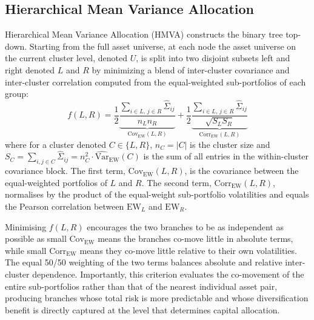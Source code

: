 \documentclass[12pt]{article}
\begin{document}
\subsection{Hierarchical Mean Variance Allocation}
Hierarchical Mean Variance Allocation (HMVA) constructs the binary tree top-down. Starting from the full asset universe, at each node the asset universe on the current cluster level, denoted $U$, is split into two disjoint subsets left and right denoted $L$ and $R$ by minimizing a blend of inter-cluster covariance and inter-cluster correlation computed from the equal-weighted sub-portfolios of each group:
\begin{equation}
  f(L, R) =
    \frac{1}{2}\underbrace{\frac{\displaystyle\sum_{i \in L,\, j \in R}
                \hat{\Sigma}_{ij}}{n_L n_R}}_{\displaystyle\mathrm{Cov}_{\mathrm{EW}}(L,R)}
    + \frac{1}{2}\underbrace{\frac{\displaystyle\sum_{i \in L,\, j \in R}
                \hat{\Sigma}_{ij}}{\sqrt{S_L S_R}}}_{\displaystyle \mathrm{Corr}_{\mathrm{EW}}(L,R)} 
  \label{eq:split-obj}
\end{equation}
where for a cluster denoted $C\in\{L,R\}$, $n_C = |C|$ is the cluster size and $S_C = \sum_{i,j \in C}\hat{\Sigma}_{ij} = n_C^2 \cdot \widehat{\mathrm{Var}}_{\mathrm{EW}}(C)$ is the sum of all entries in the within-cluster covariance block. The first term, $\mathrm{Cov}_{\mathrm{EW}}(L,R)$, is the covariance between the equal-weighted portfolios of $L$ and $R$. The second term, $\mathrm{Corr}_{\mathrm{EW}}(L,R)$, normalises by the product of the equal-weight sub-portfolio volatilities and equals the Pearson correlation between $\mathrm{EW}_L$ and $\mathrm{EW}_R$.

Minimising $f(L,R)$ encourages the two branches to be as independent as possible as small $\mathrm{Cov}_{\mathrm{EW}}$ means the branches co-move little in absolute terms, while small $\mathrm{Corr}_{\mathrm{EW}}$ means they co-move little relative to their own volatilities. The equal 50/50 weighting of the two terms balances absolute and relative inter-cluster dependence. Importantly, this criterion evaluates the co-movement of the entire sub-portfolios rather than that of the nearest individual asset pair, producing branches whose total risk is more predictable and whose diversification benefit is directly captured at the level that determines capital allocation.
\end{document}
